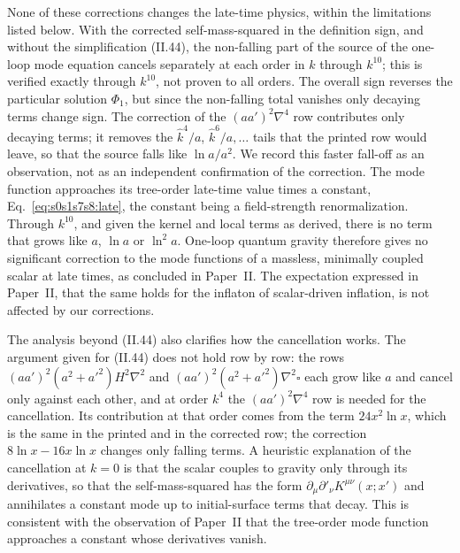 \documentclass[aps,prd,onecolumn,10pt,nofootinbib,floatfix]{revtex4-2}
\newcommand{\eqII}[1]{(II.#1)}
\begin{document}
None of these corrections changes the late-time physics, within the limitations listed below. With the corrected self-mass-squared in
the definition sign, and without the simplification \eqII{44}, the non-falling part of the source of the one-loop mode equation cancels
separately at each order in $k$ through $k^{10}$; this is verified exactly through $k^{10}$, not proven to all orders. The overall sign
reverses the particular solution $\Phi_1$, but since the non-falling total vanishes only decaying terms change sign. The correction of the $(aa')^2\nabla^4$ row contributes only decaying terms; it removes the $\hat k^4/a$, $\hat k^6/a,\dots$
tails that the printed row would leave, so that the source falls like $\ln a/a^2$. We record this faster fall-off as an observation, not as an
independent confirmation of the correction. The mode function approaches its tree-order late-time value times a constant,
Eq.~\eqref{eq:s0s1s7s8:late}, the constant being a field-strength renormalization. Through $k^{10}$, and given the kernel and local
terms as derived, there is no term that grows like $a$, $\ln a$ or $\ln^2a$. One-loop quantum gravity therefore gives no significant
correction to the mode functions of a massless, minimally coupled
scalar at late times, as concluded in Paper~II\@. The expectation expressed in Paper~II, that the same holds for the inflaton of
scalar-driven inflation, is not affected by our corrections.

The analysis beyond \eqII{44} also clarifies how the cancellation works. The argument given for \eqII{44} does not hold row by row:
the rows $(aa')^2(a^2+a'^2)H^2\nabla^2$ and $(aa')^2(a^2+a'^2)\nabla^2\square$ each grow like $a$ and cancel only against each other,
and at order $k^4$ the $(aa')^2\nabla^4$ row is needed for the cancellation. Its contribution at that order comes from the term
$24x^2\ln x$, which is the same in the printed and in the corrected row; the correction $8\ln x-16x\ln x$ changes only falling
terms. A heuristic explanation of the cancellation at $k=0$ is
that the scalar couples to gravity only through its derivatives, so that the self-mass-squared has the form $\partial_\mu\partial'_\nu
K^{\mu\nu}(x;x')$ and annihilates a constant mode up to initial-surface terms that decay. This is consistent with the observation of
Paper~II that the tree-order mode function approaches a constant whose derivatives vanish.
\end{document}
